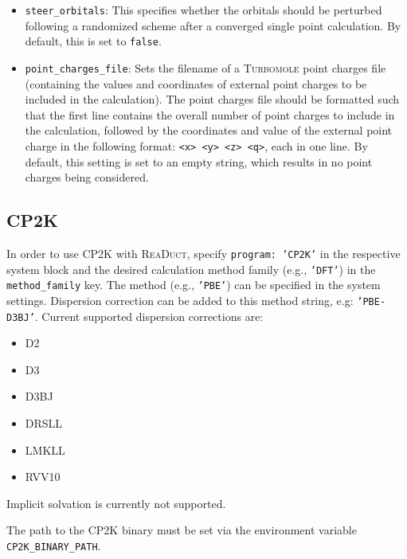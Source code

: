 \documentclass[]{tufte-book}
\begin{document}
\begin{itemize}
\item \texttt{steer\_orbitals}: This specifies whether the orbitals should be perturbed  following a randomized scheme after a converged single point calculation\cite{orbitalperturbation}. By default, this is set to \texttt{false}.
\item \texttt{point\_charges\_file}: Sets the filename of a \textsc{Turbomole} point charges file (containing the values and coordinates of
external point charges to be included in the calculation). The point charges file should be formatted such that the first line contains the overall number of point charges to include in the calculation, followed by the coordinates and value of the external point charge in the following format: \texttt{<x> <y> <z> <q>}, each in one line. By default, this setting is set to an empty string, which results
in no point charges being considered.
\end{itemize}

\subsection{\textsc{CP2K}}

In order to use \textsc{CP2K} with \textsc{ReaDuct}, specify \texttt{program: 'CP2K'} in the respective system block and the desired
calculation method family (e.g., \texttt{'DFT'}) in the \texttt{method\_family} key.
The method (e.g., \texttt{'PBE'}) can be specified in the system settings. Dispersion correction can be added to this method string, e.g: \texttt{'PBE-D3BJ'}. Current supported dispersion corrections are:
\begin{itemize}
 	\item D2
 	\item D3
 	\item D3BJ
 	\item DRSLL
 	\item LMKLL
 	\item RVV10
\end{itemize}

Implicit solvation is currently not supported.

The path to the \textsc{CP2K} binary must be set via the environment variable \texttt{CP2K\_BINARY\_PATH}.
\end{document}
